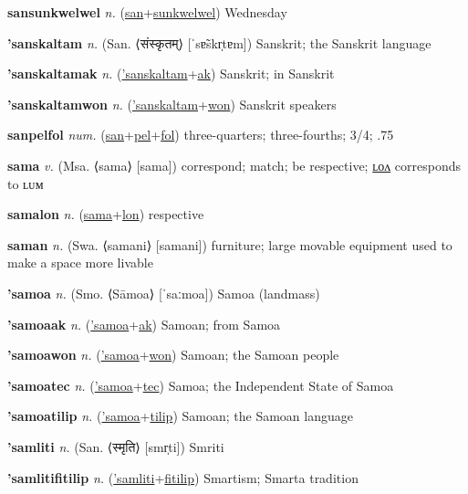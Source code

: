 \textbf{\hypertarget{sansunkwelwel}{sansunkwelwel}} \textit{n.} (\hyperlink{san}{san}+\allowbreak \hyperlink{sunkwelwel}{sunkwelwel})
Wednesday

\textbf{\hypertarget{'sanskaltam}{'sanskaltam}} \textit{n.} (San. ⟨{\devanagari{}संस्कृतम्}⟩ [ˈsɐ̃skr̩tɐm])
Sanskrit; the Sanskrit language

\textbf{\hypertarget{'sanskaltamak}{'sanskaltamak}} \textit{n.} (\hyperlink{'sanskaltam}{'sanskaltam}+\allowbreak \hyperlink{ak}{ak})
Sanskrit; in Sanskrit

\textbf{\hypertarget{'sanskaltamwon}{'sanskaltamwon}} \textit{n.} (\hyperlink{'sanskaltam}{'sanskaltam}+\allowbreak \hyperlink{won}{won})
Sanskrit speakers

\textbf{\hypertarget{sanpelfol}{sanpelfol}} \textit{num.} (\hyperlink{san}{san}+\allowbreak \hyperlink{pel}{pel}+\allowbreak \hyperlink{fol}{fol})
three-quarters; three-fourths; 3/4; .75

\textbf{\hypertarget{sama}{sama}} \textit{v.} (Msa. ⟨sama⟩ [sama])
correspond; match; be respective; \hyperlink{samalon}{ʟᴏᴧ} corresponds to ʟᴜᴍ

\textbf{\hypertarget{samalon}{samalon}} \textit{n.} (\hyperlink{sama}{sama}+\allowbreak \hyperlink{lon}{lon})
respective

\textbf{\hypertarget{saman}{saman}} \textit{n.} (Swa. ⟨samani⟩ [samani])
furniture; large movable equipment used to make a space more livable

\textbf{\hypertarget{'samoa}{'samoa}} \textit{n.} (Smo. ⟨Sāmoa⟩ [ˈsaːmoa])
Samoa (landmass)

\textbf{\hypertarget{'samoaak}{'samoaak}} \textit{n.} (\hyperlink{'samoa}{'samoa}+\allowbreak \hyperlink{ak}{ak})
Samoan; from Samoa

\textbf{\hypertarget{'samoawon}{'samoawon}} \textit{n.} (\hyperlink{'samoa}{'samoa}+\allowbreak \hyperlink{won}{won})
Samoan; the Samoan people

\textbf{\hypertarget{'samoatec}{'samoatec}} \textit{n.} (\hyperlink{'samoa}{'samoa}+\allowbreak \hyperlink{tec}{tec})
Samoa; the Independent State of Samoa

\textbf{\hypertarget{'samoatilip}{'samoatilip}} \textit{n.} (\hyperlink{'samoa}{'samoa}+\allowbreak \hyperlink{tilip}{tilip})
Samoan; the Samoan language

\textbf{\hypertarget{'samliti}{'samliti}} \textit{n.} (San. ⟨{\devanagari{}स्मृति}⟩ [smr̩ti])
Smriti

\textbf{\hypertarget{'samlitifitilip}{'samlitifitilip}} \textit{n.} (\hyperlink{'samliti}{'samliti}+\allowbreak \hyperlink{fitilip}{fitilip})
Smartism; Smarta tradition

